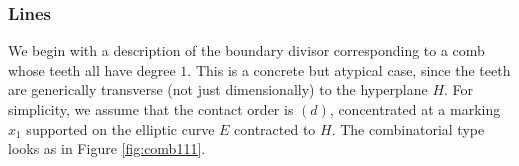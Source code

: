 \documentclass[11pt]{amsart}
\newcommand{\sqC}{\scalebox{0.8}[1.3]{$\sqsubset$}}
\newcommand{\PP}{\mathbb P}
\theoremstyle{definition}
\theoremstyle{definition}
\begin{document}
\begin{comment}

\begin{proof}[Proof of Lemma \ref{lem:corecontact}]
Consider the vertices that lie above $0\in\mathbb R_{\geq0}$ on the circle of radius $\delta$: the edges departing from them go directly (up to bubbling) to the core, since there cannot be stable vertices inside the open disc  when we have only one tropical parameter. In particular, all these edges have the same expansion factor $m$ (see again Figure \ref{fig:off_we_go}), which is maximal among those of the edges adjacent to the core. Indeed, all the edges from the core to the circle have the same length $\delta$, so the ones having maximal contact order are those that reach further from the core, and at least one must reach $0\in\mathbb R_{\geq0}$, for otherwise there would be an extra tropical parameter.

Finally, in case the maximal contact order is $m=1$, in order for $f_B$ to factor, the image of the tangent vectors at the components lying on the circle must be linearly dependent in $T_{\PP^N,x}$, where $x$ denotes the image of the core under $f_B$.in which case we can deduce as above that factorisation will be satisfied independently of the choice of alignment.
\end{proof}

For the remainder of this section we use the following notation for the combinatorial type $\Delta$; we let $\sqC_0$ denotes the vertex of dual graph corresponding to the core, $\sqC_1,\ldots,\sqC_r$ the other stable vertices (genus zero and lying on the circle, by the previous lemma) and $q_1,\ldots,q_r$ the corresponding splitting nodes.
 
\end{comment}
\subsubsection{Lines}\label{S:lines}
We begin with a description of the boundary divisor corresponding to a comb whose teeth all have degree $1$. This is a concrete but atypical case, since the teeth are generically transverse (not just dimensionally) to the hyperplane $H$. For simplicity, we assume that the contact order is $(d)$, concentrated at a marking $x_1$ supported on the elliptic curve $E$ contracted to $H$. The combinatorial type looks as in Figure \ref{fig:comb111}.
\end{document}
